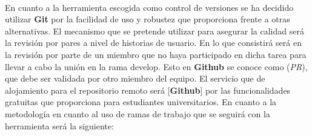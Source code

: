 \documentclass{article}
\begin{document}
\begin{itemize}
            \end{itemize}
                        
                        
            \paragraph{}
            En cuanto a la herramienta escogida como control de versiones se ha decidido utilizar \textbf{Git} por la facilidad de uso y robustez que proporciona frente a otras alternativas. El mecanismo que se pretende utilizar para asegurar la calidad será la revisión por pares a nivel de historias de usuario. En lo que consistirá será en la revisión por parte de un miembro que no haya participado en dicha tarea para llevar a cabo la unión en la rama develop. Esto en \textbf{Github} se conoce como (\textit{PR}), que debe ser validada por otro miembro del equipo. El servicio que de alojamiento para el repositorio remoto será [\textbf{Github}] por las funcionalidades gratuitas que proporciona para estudiantes universitarios. En cuanto a la metodología en cuanto al uso de ramas de trabajo que se seguirá con la herramienta será la siguiente:
            
\end{document}
